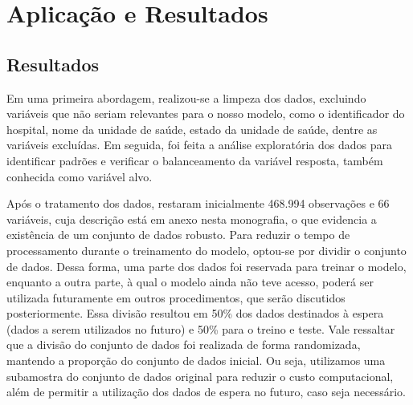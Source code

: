 \documentclass[12pt,oneside,a4paper,chapter=TITLE,
			   english,brazil]{abntex2}
\begin{document}

\chapter{Aplicação e Resultados}
\section{Resultados}

Em uma primeira abordagem, realizou-se a limpeza dos dados, excluindo variáveis que não seriam relevantes para o nosso modelo, como o identificador do hospital, nome da unidade de saúde, estado da unidade de saúde, dentre as variáveis excluídas. Em seguida,  foi feita a análise exploratória dos dados para identificar padrões e verificar o balanceamento da variável resposta, também conhecida como variável alvo.




Após o tratamento dos dados, restaram inicialmente 468.994 observações e 66 variáveis, cuja descrição está em anexo nesta monografia, o que evidencia a existência de um conjunto de dados robusto. Para reduzir o tempo de processamento durante o treinamento do modelo, optou-se por dividir o conjunto de dados. Dessa forma, uma parte dos dados foi reservada para treinar o modelo, enquanto a outra parte, à qual o modelo ainda não teve acesso, poderá ser utilizada futuramente em outros procedimentos, que serão discutidos posteriormente. Essa divisão resultou em 50\% dos dados destinados à espera (dados a serem utilizados no futuro) e 50\% para o treino e teste.  Vale ressaltar que a divisão do conjunto de dados foi realizada de forma randomizada, 
mantendo a proporção do conjunto de dados inicial. Ou seja, utilizamos uma subamostra do conjunto de dados original para reduzir o custo computacional, além de permitir a utilização dos dados de espera no futuro, caso seja necessário. 
\end{document}
